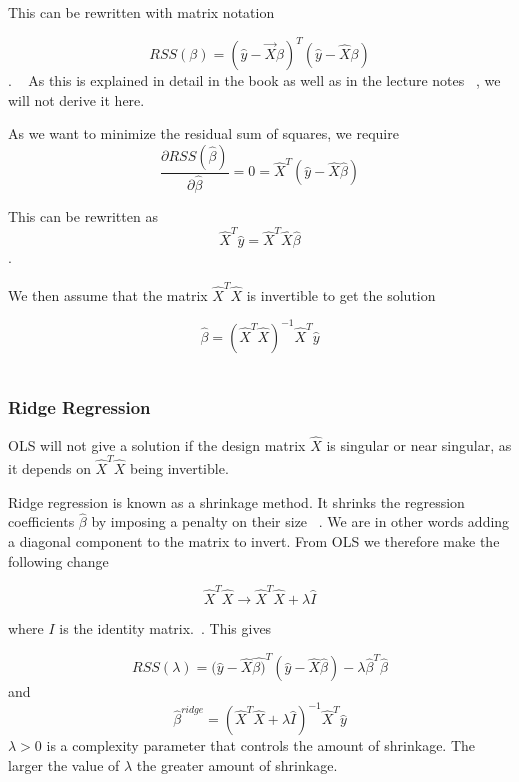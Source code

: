 This can be rewritten with matrix notation 

\begin{equation}
	RSS(\beta) = (\hat{y}-\vec{X}\beta)^T(\hat{y} - \hat{X}\beta)
\end{equation}. ~\cite{IntroStatistics} 
As this is explained in detail in the book as well as in the 
lecture notes ~\cite{LectureNotes-FysStk}, we will not derive
it here.

As we want to minimize the residual sum of squares, we require
\begin{equation}
	\frac{\partial RSS(\hat{\beta})}{\partial \hat{\beta}} 
	= 0 
	= \hat{X}^T(\hat{y} - \hat{X}\hat{\beta})
\end{equation}

This can be rewritten as 
\begin{equation}
	\hat{X}^T\hat{y} = \hat{X}^T\hat{X}\hat{\beta} 
\end{equation}.

We then assume that the matrix \(\hat{X}^T\hat{X}\) 
is invertible to get the solution

\begin{equation}
	\hat{\beta} = (\hat{X}^T\hat{X})^{-1}\hat{X}^T\hat{y}
\end{equation}
~\cite{LectureNotes-FysStk}~\cite{IntroStatistics}

\subsubsection{Ridge Regression}\label{seq:ridge}
OLS will not give a solution if the design matrix \(\hat{X}\) is singular
or near singular, as it depends on \(\hat{X}^T\hat{X}\) being invertible. 
~\cite{LectureNotes-FysStk}

Ridge regression is known as a shrinkage method. It shrinks the regression
coefficients \(\hat{\beta}\) by imposing a penalty on their size
~\cite{IntroStatistics}. We are in other words adding a diagonal component
to the matrix to invert. From OLS we therefore make the following change

\begin{equation}
	\hat{X}^T\hat{X} \rightarrow \hat{X}^T\hat{X} + \lambda \hat{I}
\end{equation}

where $I$ is the identity matrix.~\cite{LectureNotes-FysStk}.
This gives

\begin{equation}
	RSS(\lambda) = (\hat{y}-\hat{X}\hat{\beta)}^T(\hat{y} 
	- \hat{X}\hat{\beta})
	- \lambda \hat{\beta}^T\hat{\beta}
\end{equation}
and
\begin{equation}
	\hat{\beta}^{ridge} = (\hat{X}^T\hat{X} 
	+ \lambda \hat{I})^{-1}\hat{X}^T\hat{y} 
\end{equation}
\(\lambda > 0 \) is a complexity parameter that controls the amount
of shrinkage. The larger the value of \(\lambda\) the greater amount of 
shrinkage.
\cite{IntroStatistics}

